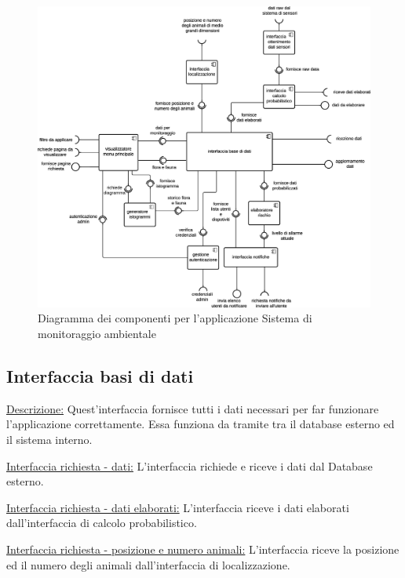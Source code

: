 \begin{figure}[ht]
    \centering
    \includegraphics[scale=0.28]{Img/DiagrammaDeiComponenti.eps}
    \caption{Diagramma dei componenti per l'applicazione Sistema di monitoraggio ambientale}
\end{figure}

\subsection*{Interfaccia basi di dati}
\underline{Descrizione:}
Quest'interfaccia fornisce tutti i dati necessari per far funzionare l'applicazione correttamente. Essa funziona da tramite tra il database esterno ed il sistema interno.

\vspace{5mm}
\noindent
\underline{Interfaccia richiesta - dati:}
L'interfaccia richiede e riceve i dati dal Database esterno.

\vspace{5mm}
\noindent
\underline{Interfaccia richiesta - dati elaborati:}
L'interfaccia riceve i dati elaborati dall'interfaccia di calcolo probabilistico.

\vspace{5mm}
\noindent
\underline{Interfaccia richiesta - posizione e numero animali:}
L'interfaccia riceve la posizione ed il numero degli animali dall'interfaccia di localizzazione.

